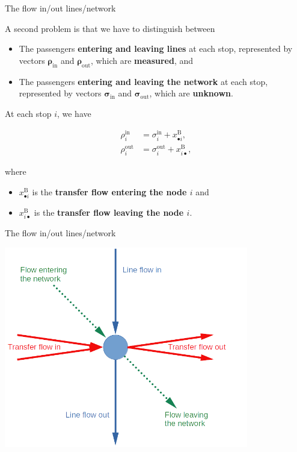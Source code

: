 \documentclass[10pt]{beamer}
\newcommand{\imp}[1]{\textbf{\color{cyan}#1}}
\begin{document}
	
	\begin{frame}{The flow in/out lines/network}
		
		A second problem is that we have to distinguish between
		
		\begin{itemize}
			\item The passengers \imp{entering and leaving lines} at each stop, represented by vectors \imp{$\bm{\rho}_\text{in}$} and \imp{$\bm{\rho}_\text{out}$}, which are \imp{measured}, and 
			\item The passengers \imp{entering and leaving the network} at each stop, represented by vectors \imp{$\bm{\sigma}_\text{in}$} and \imp{$\bm{\sigma}_\text{out}$}, which are \imp{unknown}.
		\end{itemize}
	
		At each stop $i$, we have 
		
		\begin{align*}
			\rho^\text{in}_i &= \sigma^\text{in}_i + x^\text{B}_{\bullet i}, \\
			\rho^\text{out}_i &= \sigma^\text{out}_i + x^\text{B}_{i \bullet},
		\end{align*}
		
		where 
		\begin{itemize}
			\item $x^\text{B}_{\bullet i}$ is the \imp{transfer flow entering the node $i$} and
			\item $x^\text{B}_{i \bullet}$ is the \imp{transfer flow leaving the node $i$}.
		\end{itemize}
	\end{frame}
	
	
	\begin{frame}{The flow in/out lines/network}
		\begin{center}
			\hspace{0.1cm} \includegraphics[width=0.8\textwidth]{img/flow_balance.png}
		\end{center}
	\end{frame}
	
\end{document}

